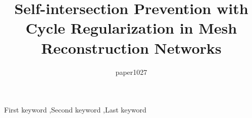 \documentclass[final,3p]{elsarticle}
\begin{document}
\begin{frontmatter}
\title{Self-intersection Prevention with Cycle Regularization in Mesh Reconstruction Networks}

\author{paper1027}




\begin{keyword}
First keyword \sep Second keyword \sep Last keyword
\end{keyword}

\end{frontmatter}

\linenumbers








\end{document}
